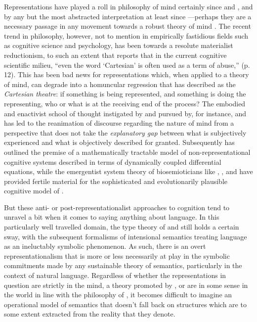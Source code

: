 Representations have played a roll in philosophy of mind certainly since \cite{Descartes1911} and \cite{Hobbes1651}, and by any but the most abstracted interpretation at least since \cite{Plato1892}---perhaps they are a necessary passage in any movement towards a robust theory of mind \citep[if, in fact, such a theory is even desirable---\emph{cf}][]{Rorty1979}.  The recent trend in philosophy, however, not to mention in empirically fastidious fields such as cognitive science and psychology, has been towards a resolute materialist reductionism, to such an extent that \cite{Rowlands2010} reports that in the current cognitive scientific milieu, ``even the word `Cartesian' is often used as a term of abuse,'' (p. 12).  This has been bad news for representations which, when applied to a theory of mind, can degrade into a homuncular regression that \cite{Dennett1991} has described as the \emph{Cartesian theatre}: if something is being represented, and something is doing the representing, who or what is at the receiving end of the process?  The embodied and enactivist school of thought instigated by \cite{MaturanaEA1987} and pursued by, for instance, \cite{Haugeland1993} and \cite{Thompson2007} has led to the reanimation of discourse regarding the nature of mind from a perspective that does not take the \emph{explanatory gap} \citep{Levine1983} between what is subjectively experienced and what is objectively described for granted.  Subsequently \cite{VanGelder1995} has outlined the premise of a mathematically tractable model of non-representational cognitive systems described in terms of dynamically coupled differential equations, while the emergentist system theory of biosemioticians like \cite{Kauffman1995}, \cite{Hoffmeyer1997}, and \cite{Pattee2001} have provided fertile material for the sophisticated and evolutionarily plausible cognitive model of \cite{Deacon2011}.

But these anti- or post-representationalist approaches to cognition tend to unravel a bit when it comes to saying anything about language.  In this particularly well travelled domain, the type theory of \cite{WhiteheadEA1927} and \cite{Church1940} still holds a certain sway, with the subsequent formalisms of intensional semantics \citep{FoxEA2005} treating language as an ineluctably symbolic phenomenon.  As such, there is an overt representationalism that is more or less necessarily at play in the symbolic commitments made by any sustainable theory of semantics, particularly in the context of natural language.  Regardless of whether the representations in question are strictly in the mind, a theory promoted by \cite{Fodor2001}, or are in some sense in the world in line with the philosophy of \cite{Putnam1975}, it becomes difficult to imagine an operational model of semantics that doesn't fall back on structures which are to some extent extracted from the reality that they denote.

